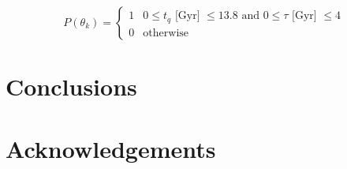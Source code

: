 \documentclass[a4paper,fleqn,usenatbib]{mnras}
\begin{document}
   

   \begin{equation}
      P(\theta_{k}) = \begin{cases}
                       1 & 0\leq t_{q}\text{ [Gyr] } \leq 13.8 \text{ and }  0 \leq \tau\text{ [Gyr] } \leq 4 \\
                       0 & \text{otherwise}
                      \end{cases}
      \label{eq:prior}
   \end{equation}

\section{Conclusions}

\section*{Acknowledgements}










\appendix




\bsp	%
\label{lastpage}
\end{document}

